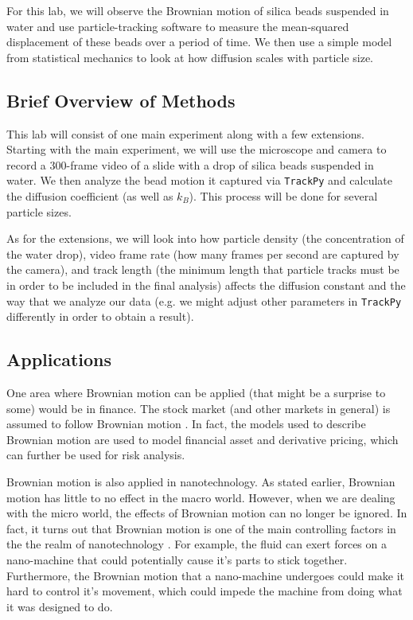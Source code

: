 \documentclass[twocolumn,amsmath,amssymb,pra, floatfix]{revtex4-2}
\begin{document}
For this lab, we will observe the Brownian motion of silica beads suspended in water and use particle-tracking software to measure the mean-squared displacement of these beads over a period of time. We then use a simple model from statistical mechanics to look at how diffusion scales with particle size.

\subsection{Brief Overview of Methods}
This lab will consist of one main experiment along with a few extensions. Starting with the main experiment, we will use the microscope and camera to record a 300-frame video of a slide with a drop of silica beads suspended in water. We then analyze the bead motion it captured via \texttt{TrackPy} and calculate the diffusion coefficient (as well as $k_{B}$). This process will be done for several particle sizes.

As for the extensions, we will look into how particle density (the concentration of the water drop), video frame rate (how many frames per second are captured by the camera), and track length (the minimum length that particle tracks must be in order to be included in the final analysis) affects the diffusion constant and the way that we analyze our data (e.g. we might adjust other parameters in \texttt{TrackPy} differently in order to obtain a result).

\subsection{Applications}
One area where Brownian motion can be applied (that might be a surprise to some) would be in finance. The stock market (and other markets in general) is assumed to follow Brownian motion \cite{econ}. In fact, the models used to describe Brownian motion are used to model financial asset and derivative pricing, which can further be used for risk analysis. 

Brownian motion is also applied in nanotechnology. As stated earlier, Brownian motion has little to no effect in the macro world. However, when we are dealing with the micro world, the effects of Brownian motion can no longer be ignored. In fact, it turns out that Brownian motion is one of the main controlling factors in the the realm of nanotechnology \cite{nano}. For example, the fluid can exert forces on a nano-machine that could potentially cause it's parts to stick together. Furthermore, the Brownian motion that a nano-machine undergoes could make it hard to control it's movement, which could impede the machine from doing what it was designed to do. 
\end{document}
